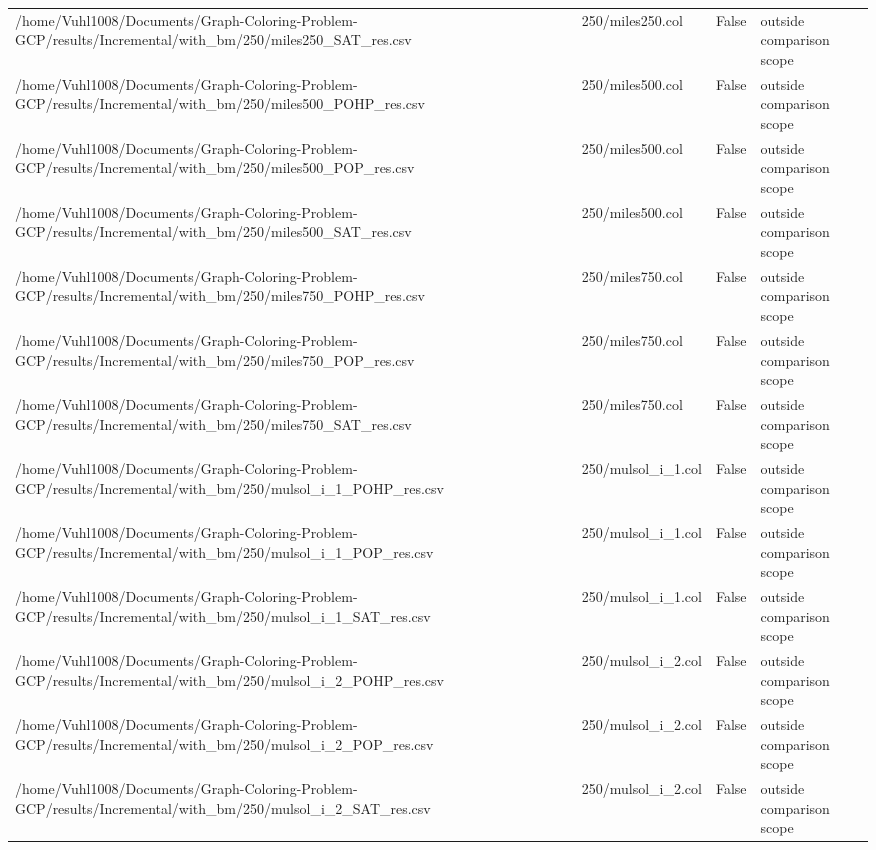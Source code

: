 \begin{table}[htbp]
\begin{tabular}{llll}
/home/Vuhl1008/Documents/Graph-Coloring-Problem-GCP/results/Incremental/with\_bm/250/miles250\_SAT\_res.csv & 250/miles250.col & False & outside comparison scope \\
/home/Vuhl1008/Documents/Graph-Coloring-Problem-GCP/results/Incremental/with\_bm/250/miles500\_POHP\_res.csv & 250/miles500.col & False & outside comparison scope \\
/home/Vuhl1008/Documents/Graph-Coloring-Problem-GCP/results/Incremental/with\_bm/250/miles500\_POP\_res.csv & 250/miles500.col & False & outside comparison scope \\
/home/Vuhl1008/Documents/Graph-Coloring-Problem-GCP/results/Incremental/with\_bm/250/miles500\_SAT\_res.csv & 250/miles500.col & False & outside comparison scope \\
/home/Vuhl1008/Documents/Graph-Coloring-Problem-GCP/results/Incremental/with\_bm/250/miles750\_POHP\_res.csv & 250/miles750.col & False & outside comparison scope \\
/home/Vuhl1008/Documents/Graph-Coloring-Problem-GCP/results/Incremental/with\_bm/250/miles750\_POP\_res.csv & 250/miles750.col & False & outside comparison scope \\
/home/Vuhl1008/Documents/Graph-Coloring-Problem-GCP/results/Incremental/with\_bm/250/miles750\_SAT\_res.csv & 250/miles750.col & False & outside comparison scope \\
/home/Vuhl1008/Documents/Graph-Coloring-Problem-GCP/results/Incremental/with\_bm/250/mulsol\_i\_1\_POHP\_res.csv & 250/mulsol\_i\_1.col & False & outside comparison scope \\
/home/Vuhl1008/Documents/Graph-Coloring-Problem-GCP/results/Incremental/with\_bm/250/mulsol\_i\_1\_POP\_res.csv & 250/mulsol\_i\_1.col & False & outside comparison scope \\
/home/Vuhl1008/Documents/Graph-Coloring-Problem-GCP/results/Incremental/with\_bm/250/mulsol\_i\_1\_SAT\_res.csv & 250/mulsol\_i\_1.col & False & outside comparison scope \\
/home/Vuhl1008/Documents/Graph-Coloring-Problem-GCP/results/Incremental/with\_bm/250/mulsol\_i\_2\_POHP\_res.csv & 250/mulsol\_i\_2.col & False & outside comparison scope \\
/home/Vuhl1008/Documents/Graph-Coloring-Problem-GCP/results/Incremental/with\_bm/250/mulsol\_i\_2\_POP\_res.csv & 250/mulsol\_i\_2.col & False & outside comparison scope \\
/home/Vuhl1008/Documents/Graph-Coloring-Problem-GCP/results/Incremental/with\_bm/250/mulsol\_i\_2\_SAT\_res.csv & 250/mulsol\_i\_2.col & False & outside comparison scope \\

\end{tabular}
\end{table}
